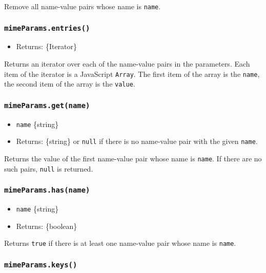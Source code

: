 Remove all name-value pairs whose name is \texttt{name}.

\subsubsection{\texorpdfstring{\texttt{mimeParams.entries()}}{mimeParams.entries()}}\label{mimeparams.entries}

\begin{itemize}
\tightlist
\item
  Returns: \{Iterator\}
\end{itemize}

Returns an iterator over each of the name-value pairs in the parameters.
Each item of the iterator is a JavaScript \texttt{Array}. The first item
of the array is the \texttt{name}, the second item of the array is the
\texttt{value}.

\subsubsection{\texorpdfstring{\texttt{mimeParams.get(name)}}{mimeParams.get(name)}}\label{mimeparams.getname}

\begin{itemize}
\tightlist
\item
  \texttt{name} \{string\}
\item
  Returns: \{string\} or \texttt{null} if there is no name-value pair
  with the given \texttt{name}.
\end{itemize}

Returns the value of the first name-value pair whose name is
\texttt{name}. If there are no such pairs, \texttt{null} is returned.

\subsubsection{\texorpdfstring{\texttt{mimeParams.has(name)}}{mimeParams.has(name)}}\label{mimeparams.hasname}

\begin{itemize}
\tightlist
\item
  \texttt{name} \{string\}
\item
  Returns: \{boolean\}
\end{itemize}

Returns \texttt{true} if there is at least one name-value pair whose
name is \texttt{name}.

\subsubsection{\texorpdfstring{\texttt{mimeParams.keys()}}{mimeParams.keys()}}\label{mimeparams.keys}

